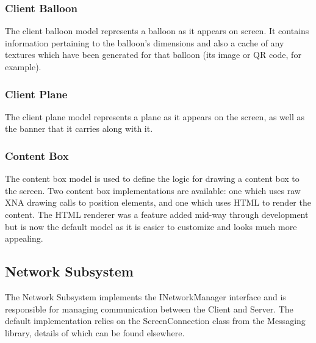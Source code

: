 \subsubsection{Client Balloon}
The client balloon model represents a balloon as it appears on screen. It 
contains information pertaining to the balloon's dimensions and also a cache of
any textures which have been generated for that balloon (its image or QR code, 
for example). 

\subsubsection{Client Plane}
The client plane model represents a plane as it appears on the screen, as well
as the banner that it carries along with it.

\subsubsection{Content Box}
The content box model is used to define the logic for drawing a content box to
the screen. Two content box implementations are available: one which uses raw
XNA drawing calls to position elements, and one which uses HTML to render the
content. The HTML renderer was a feature added mid-way through development but
is now the default model as it is easier to customize and looks much more
appealing. 

\clearpage{}
\subsection{Network Subsystem}
The Network Subsystem implements the INetworkManager interface and is 
responsible for managing communication between the Client and Server. The 
default implementation relies on the ScreenConnection class from the Messaging
library, details of which can be found elsewhere. 

